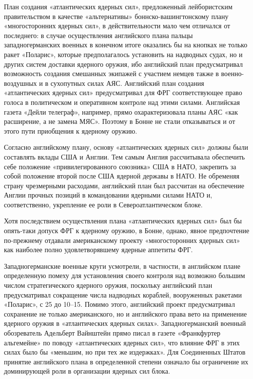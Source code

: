 \documentclass[12pt, a4paper, openany]{book}
\begin{document}
		План создания «атлантических ядерных сил», предложенный лейбористским правительством в качестве «альтернативы» боннско-вашингтонскому плану «многосторонних ядерных сил», в действительности мало чем отличался от последнего: в случае осуществления английского плана пальцы западногерманских военных в конечном итоге оказались бы на кнопках не только ракет «Поларис», которые предполагалось установить на надводных судах, но и других систем доставки ядерного оружия, ибо английский план предусматривал возможность создания смешанных экипажей с участием немцев также в военно-воздушных и в сухопутных силах АЯС. Английский план создания «атлантических ядерных сил» предусматривал для ФРГ соответствующее право голоса в политическом и оперативном контроле над этими силами. Английская газета «Дейли телеграф», например, прямо охарактеризовала планы АЯС «как расширение, а не замена МЯС». Поэтому в Бонне не стали отказываться и от этого пути приобщения к ядерному оружию.
		
Согласно английскому плану, основу «атлантических ядерных сил» должны были составлять вклады США и Англии. Тем самым Англия рассчитывала обеспечить себе положение «привилегированного союзника» США в НАТО, закрепить за собой положение второй после США ядерной державы в НАТО. Не обременяя страну чрезмерными расходами, английский план был рассчитан на обеспечение Англии прочных позиций в командовании ядерными силами НАТО и, соответственно, укрепление ее роли в Североатлантическом блоке.
		
Хотя последствием осуществления плана «атлантических ядерных сил» был бы опять-таки допуск ФРГ к ядерному оружию, в Бонне, однако, явное предпочтение по-прежнему отдавали американскому проекту «многосторонних ядерных сил» как наиболее полно удовлетворявшему ядерные аппетиты ФРГ.
		
Западногерманские военные круги усмотрели, в частности, в английском плане определенную помеху для установления своего контроля над возможно большим числом стратегического ядерного оружия, поскольку английский план предусматривал сокращение числа надводных кораблей, вооруженных ракетами «Поларис», с 25 до 10–15. Помимо этого, английский проект предусматривал сохранение не только американского, но и английского права вето на применение ядерного оружия в «атлантических ядерных силах». Западногерманский военный обозреватель Адельберт Вайнштейн прямо писал в газете «Франкфуртер альгемейне» по поводу «атлантических ядерных сил», что влияние ФРГ в этих силах было бы «меньшим, но при тех же издержках». Для Соединенных Штатов принятие английского плана в определенной степени означало бы ограничение их доминирующей роли в организации ядерных сил блока.
		
\end{document}
